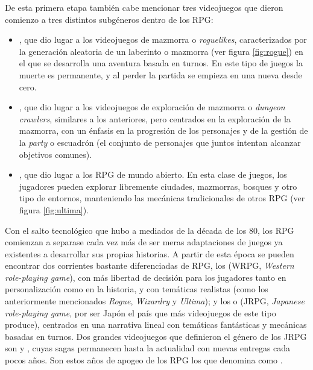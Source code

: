 De esta primera etapa también cabe mencionar tres videojuegos que dieron comienzo a tres distintos subgéneros dentro de los RPG: 
\begin{itemize}
\item {}, que dio lugar a los videojuegos de mazmorra o \textit{roguelikes}, caracterizados por la generación aleatoria de un laberinto o mazmorra (ver figura \ref{fig:rogue}) en el que se desarrolla una aventura basada en turnos. En este tipo de juegos la muerte es permanente, y al perder la partida se empieza en una nueva desde cero. 
\item {}, que dio lugar a los videojuegos de exploración de mazmorra o \textit{dungeon crawlers}, similares a los anteriores, pero centrados en la exploración de la mazmorra, con un énfasis en la progresión de los personajes y de la gestión de la \textit{party} o escuadrón (el conjunto de personajes que juntos intentan alcanzar objetivos comunes). 
\item {}, que dio lugar a los RPG de mundo abierto. En esta clase de juegos, los jugadores pueden explorar libremente ciudades, mazmorras, bosques y otro tipo de entornos, manteniendo las mecánicas tradicionales de otros RPG (ver figura \ref{fig:ultima}). 
\end{itemize}

\medskip

Con el salto tecnológico que hubo a mediados de la década de los 80, los RPG comienzan a separase cada vez más de ser meras adaptaciones de juegos ya existentes a desarrollar sus propias historias. A partir de esta época se pueden encontrar dos corrientes bastante diferenciadas de RPG, los  (WRPG, \textit{Western role-playing game}), con más libertad de decisión para los jugadores tanto en personalización como en la historia, y con temáticas realistas (como los anteriormente mencionados \textit{Rogue}, \textit{Wizardry} y \textit{Ultima}); y los  o  (JRPG, \textit{Japanese role-playing game}, por ser Japón el país que más videojuegos de este tipo produce), centrados en una narrativa lineal con temáticas fantásticas y mecánicas basadas en turnos. Dos grandes videojuegos que definieron el género de los JRPG son  y , cuyas sagas permanecen hasta la actualidad con nuevas entregas cada pocos años. Son estos años de apogeo de los RPG los que \citeauthor{barton2008dungeons} denomina como .

